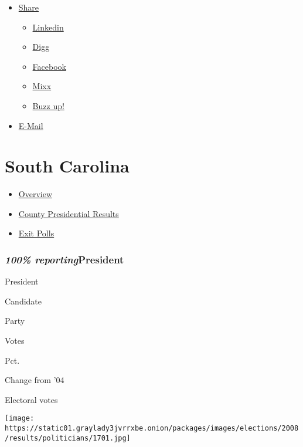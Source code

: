 \begin{itemize}
\tightlist
\item
  \href{//www.nytimes3xbfgragh.onion/gst/mostpopular.html}{Share}

  \begin{itemize}
  \tightlist
  \item
    \href{//www.linkedin.com}{Linkedin}
  \item
    \href{//digg.com/search?section=all\&s=nytimes}{Digg}
  \item
    \href{//www.facebookcorewwwi.onion/nytimes}{Facebook}
  \item
    \href{//www.mixx.com}{Mixx}
  \item
    \href{//buzz.yahoo.com}{Buzz up!}
  \end{itemize}
\item
  \href{//www.nytimes3xbfgragh.onion/gst/mostemailed.html}{E-Mail}
\end{itemize}

\hypertarget{south-carolina}{%
\section{South Carolina}\label{south-carolina}}

\begin{itemize}
\tightlist
\item
  \href{south-carolina.html}{Overview}
\item
  \href{president/south-carolina.html}{County Presidential Results}
\item
  \href{exitpolls/south-carolina.html}{Exit Polls}
\end{itemize}

\hypertarget{100-reportingpresident}{%
\subsubsection{\texorpdfstring{\emph{100\%
reporting}President}{100\% reportingPresident}}\label{100-reportingpresident}}

President

Candidate

Party

Votes

Pct.~~~

Change from '04

Electoral votes

\texttt{[image: https://static01.graylady3jvrrxbe.onion/packages/images/elections/2008/results/politicians/1701.jpg]}

